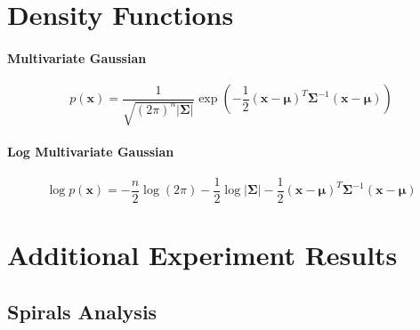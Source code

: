 \chapter{Density Functions}

\subsubsection{Multivariate Gaussian}

\begin{equation}
    p(\mathbf{x}) = \frac{1}{\sqrt{(2\pi)^n |\boldsymbol{\Sigma}|}} \exp\left(-\frac{1}{2} (\mathbf{x} - \boldsymbol{\mu})^T \boldsymbol{\Sigma}^{-1} (\mathbf{x} - \boldsymbol{\mu})\right)
    \label{eq:mvn}
\end{equation}

\subsubsection{Log Multivariate Gaussian}

\begin{equation}
    \log p(\mathbf{x}) = -\frac{n}{2} \log(2\pi) - \frac{1}{2} \log |\boldsymbol{\Sigma}| - \frac{1}{2} (\mathbf{x} - \boldsymbol{\mu})^T \boldsymbol{\Sigma}^{-1} (\mathbf{x} - \boldsymbol{\mu})
    \label{eq:log_mvn}
\end{equation}


\chapter{Additional Experiment Results}

\section{Spirals Analysis}
\label{sec:app_spirals}

